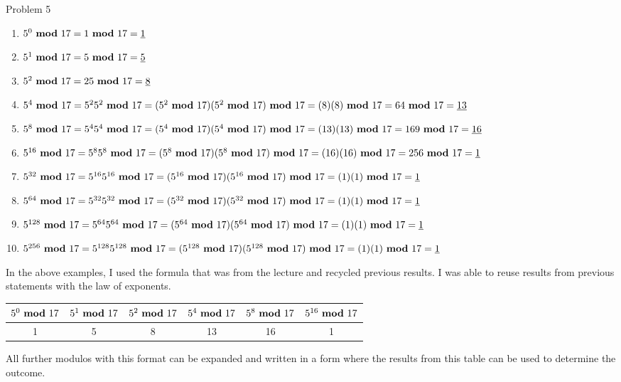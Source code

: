 \begin{problem}{Problem 5}
    \begin{Highlight}[Solution]
        \begin{enumerate}[label = (\alph*)]
            \item $5^{0} \text{ \textbf{mod} } 17 = 1 \text{ \textbf{mod} } 17 = \underbar{1}$
            \item $5^{1} \text{ \textbf{mod} } 17 = 5 \text{ \textbf{mod} } 17 = \underbar{5}$
            \item $5^{2} \text{ \textbf{mod} } 17 = 25 \text{ \textbf{mod} } 17 = \underbar{8}$
            \item $5^{4} \text{ \textbf{mod} } 17 = 5^{2}5^{2} \text{ \textbf{mod} } 17 = (5^{2} \text{ \textbf{mod} } 17)(5^{2} \text{ \textbf{mod} } 17) \text{ \textbf{mod} } 17 = (8)(8) \text{ \textbf{mod} } 17 = 64 \text{ \textbf{mod} } 17 = \underbar{13}$
            \item $5^{8} \text{ \textbf{mod} } 17 = 5^{4}5^{4} \text{ \textbf{mod} } 17 = (5^{4} \text{ \textbf{mod} } 17)(5^{4} \text{ \textbf{mod} } 17) \text{ \textbf{mod} } 17 = (13)(13) \text{ \textbf{mod} } 17 = 169 \text{ \textbf{mod} } 17 = \underbar{16}$
            \item $5^{16} \text{ \textbf{mod} } 17 = 5^{8}5^{8} \text{ \textbf{mod} } 17 = (5^{8} \text{ \textbf{mod} } 17)(5^{8} \text{ \textbf{mod} } 17) \text{ \textbf{mod} } 17 = (16)(16) \text{ \textbf{mod} } 17 =  256 \text{ \textbf{mod} } 17 = \underbar{1}$
            \item $5^{32} \text{ \textbf{mod} } 17 = 5^{16}5^{16} \text{ \textbf{mod} } 17 = (5^{16} \text{ \textbf{mod} } 17)(5^{16} \text{ \textbf{mod} } 17) \text{ \textbf{mod} } 17 = (1)(1) \text{ \textbf{mod} } 17 = \underbar{1}$
            \item $5^{64} \text{ \textbf{mod} } 17 = 5^{32}5^{32} \text{ \textbf{mod} } 17 = (5^{32} \text{ \textbf{mod} } 17)(5^{32} \text{ \textbf{mod} } 17) \text{ \textbf{mod} } 17 = (1)(1) \text{ \textbf{mod} } 17 = \underbar{1}$
            \item $5^{128} \text{ \textbf{mod} } 17 = 5^{64}5^{64} \text{ \textbf{mod} } 17 = (5^{64} \text{ \textbf{mod} } 17)(5^{64} \text{ \textbf{mod} } 17) \text{ \textbf{mod} } 17 = (1)(1) \text{ \textbf{mod} } 17 = \underbar{1}$
            \item $5^{256} \text{ \textbf{mod} } 17 = 5^{128}5^{128} \text{ \textbf{mod} } 17 = (5^{128} \text{ \textbf{mod} } 17)(5^{128} \text{ \textbf{mod} } 17) \text{ \textbf{mod} } 17 = (1)(1) \text{ \textbf{mod} } 17 = \underbar{1}$
        \end{enumerate}
    \end{Highlight}

    \begin{Highlight}[Synopsis]
        In the above examples, I used the formula that was from the lecture and recycled previous results. I was able to reuse results from previous statements with the law of exponents.

        \begin{center}
            \begin{tabular}[ht]{|c|c|c|c|c|c|}
                \hline $5^{0} \text{ \textbf{mod} } 17$ & $5^{1} \text{ \textbf{mod} } 17$ & $5^{2} \text{ \textbf{mod} } 17$ & $5^{4} \text{ \textbf{mod} } 17$ & $5^{8} \text{ \textbf{mod} } 17$ & $5^{16} \text{ \textbf{mod} } 17$ \\ \hline
                1 & 5 & 8 & 13 & 16 & 1 \\ \hline
            \end{tabular}
        \end{center}
        All further modulos with this format can be expanded and written in a form where the results from this table can be used to determine the outcome.
    \end{Highlight}
\end{problem}

